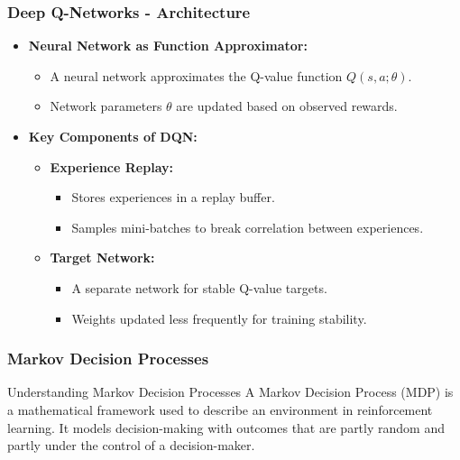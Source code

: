 \documentclass[aspectratio=169]{beamer}
\begin{document}
\begin{frame}[fragile]
    \frametitle{Deep Q-Networks - Architecture}
    \begin{itemize}
        \item \textbf{Neural Network as Function Approximator:}
        \begin{itemize}
            \item A neural network approximates the Q-value function \( Q(s, a; \theta) \).
            \item Network parameters \( \theta \) are updated based on observed rewards.
        \end{itemize}
        
        \item \textbf{Key Components of DQN:}
        \begin{itemize}
            \item \textbf{Experience Replay:} 
            \begin{itemize}
                \item Stores experiences in a replay buffer.
                \item Samples mini-batches to break correlation between experiences.
            \end{itemize}

            \item \textbf{Target Network:}
            \begin{itemize}
                \item A separate network for stable Q-value targets.
                \item Weights updated less frequently for training stability.
            \end{itemize}
        \end{itemize}
    \end{itemize}
\end{frame}

\begin{frame}[fragile]
    \frametitle{Markov Decision Processes}
    \begin{block}{Understanding Markov Decision Processes}
        A Markov Decision Process (MDP) is a mathematical framework used to describe an environment in reinforcement learning. It models decision-making with outcomes that are partly random and partly under the control of a decision-maker.
    \end{block}
\end{frame}
\end{document}
